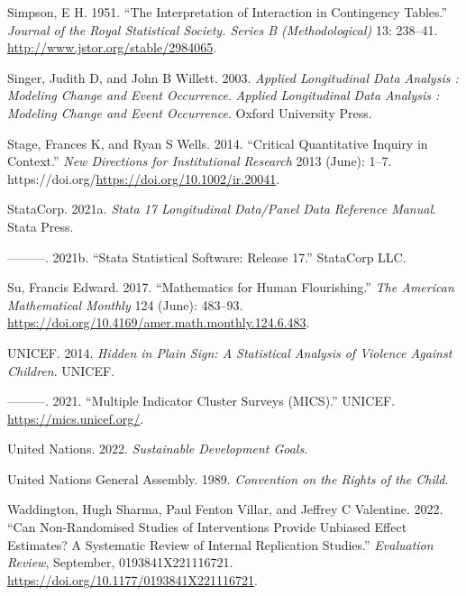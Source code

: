 \documentclass[
  letterpaper,
  DIV=11,
  numbers=noendperiod]{scrreprt}
\newlength{\cslhangindent}
\newlength{\cslentryspacingunit} %
\newenvironment{CSLReferences}[2] %
 {%
  \setlength{\parindent}{0pt}
  \ifodd #1
  \let\oldpar\par
  \def\par{\hangindent=\cslhangindent\oldpar}
  \fi
  \setlength{\parskip}{#2\cslentryspacingunit}
 }%
 {}
\begin{document}
\begin{CSLReferences}{1}{0}
\leavevmode{}%
Simpson, E H. 1951. {``The Interpretation of Interaction in Contingency
Tables.''} \emph{Journal of the Royal Statistical Society. Series B
(Methodological)} 13: 238--41.
\url{http://www.jstor.org/stable/2984065}.

\leavevmode{}%
Singer, Judith D, and John B Willett. 2003. \emph{Applied Longitudinal
Data Analysis : Modeling Change and Event Occurrence}. \emph{Applied
Longitudinal Data Analysis : Modeling Change and Event Occurrence}.
Oxford University Press.

\leavevmode{}%
Stage, Frances K, and Ryan S Wells. 2014. {``Critical Quantitative
Inquiry in Context.''} \emph{New Directions for Institutional Research}
2013 (June): 1--7.
https://doi.org/\url{https://doi.org/10.1002/ir.20041}.

\leavevmode{}%
StataCorp. 2021a. \emph{Stata 17 Longitudinal Data/Panel Data Reference
Manual}. Stata Press.

\leavevmode{}%
---------. 2021b. {``Stata Statistical Software: Release 17.''}
StataCorp LLC.

\leavevmode{}%
Su, Francis Edward. 2017. {``Mathematics for Human Flourishing.''}
\emph{The American Mathematical Monthly} 124 (June): 483--93.
\url{https://doi.org/10.4169/amer.math.monthly.124.6.483}.

\leavevmode{}%
UNICEF. 2014. \emph{Hidden in Plain Sign: A Statistical Analysis of
Violence Against Children}. UNICEF.

\leavevmode{}%
---------. 2021. {``Multiple Indicator Cluster Surveys (MICS).''}
UNICEF. \url{https://mics.unicef.org/}.

\leavevmode{}%
United Nations. 2022. \emph{Sustainable Development Goals}.

\leavevmode{}%
United Nations General Assembly. 1989. \emph{Convention on the Rights of
the Child}.

\leavevmode{}%
Waddington, Hugh Sharma, Paul Fenton Villar, and Jeffrey C Valentine.
2022. {``Can Non-Randomised Studies of Interventions Provide Unbiased
Effect Estimates? A Systematic Review of Internal Replication
Studies.''} \emph{Evaluation Review}, September, 0193841X221116721.
\url{https://doi.org/10.1177/0193841X221116721}.


\end{CSLReferences}
\end{document}
